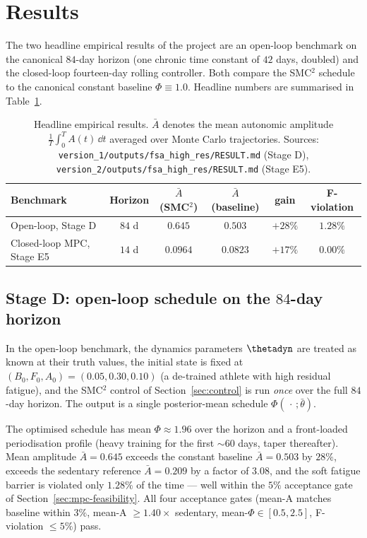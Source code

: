\section{Results}\label{sec:results}

The two headline empirical results of the project are an open-loop
benchmark on the canonical $84$-day horizon (one chronic time constant
of $42$ days, doubled) and the closed-loop fourteen-day rolling
controller. Both compare the SMC${}^2$ schedule to the canonical
constant baseline $\Phi \equiv 1.0$. Headline numbers are summarised in
Table~\ref{tab:results}.

\begin{table}[h]
\centering
\small
\begin{tabular}{@{}lccccc@{}}
\toprule
Benchmark & Horizon & $\bar A$ (SMC${}^2$) & $\bar A$ (baseline) & gain & F-violation \\
\midrule
Open-loop, Stage D     & $84$ d & $0.645$  & $0.503$  & $+28\%$ & $1.28\%$ \\
Closed-loop MPC, Stage E5 & $14$ d & $0.0964$ & $0.0823$ & $+17\%$ & $0.00\%$ \\
\bottomrule
\end{tabular}
\caption{Headline empirical results. $\bar A$ denotes the mean
autonomic amplitude $\frac{1}{T}\int_0^T A(t)\,\dd t$ averaged over Monte
Carlo trajectories. Sources:
\texttt{version\_1/outputs/fsa\_high\_res/RESULT.md} (Stage D),
\texttt{version\_2/outputs/fsa\_high\_res/RESULT.md} (Stage E5).}
\label{tab:results}
\end{table}

\subsection{Stage D: open-loop schedule on the $84$-day horizon}

In the open-loop benchmark, the dynamics parameters $\thetadyn$ are
treated as known at their truth values, the initial state is fixed at
$(B_0,F_0,A_0) = (0.05,0.30,0.10)$ (a de-trained athlete with high
residual fatigue), and the SMC${}^2$ control of Section~\ref{sec:control}
is run \emph{once} over the full $84$-day horizon. The output is a single
posterior-mean schedule $\Phi(\,\cdot\,;\bar\theta)$.

The optimised schedule has mean $\Phi \approx 1.96$ over the horizon and
a front-loaded periodisation profile (heavy training for the first
$\sim 60$ days, taper thereafter). Mean amplitude
$\bar A = 0.645$ exceeds the constant baseline $\bar A = 0.503$ by
$28\%$, exceeds the sedentary reference $\bar A = 0.209$ by a factor of
$3.08$, and the soft fatigue barrier is violated only $1.28\%$ of the
time --- well within the $5\%$ acceptance gate of
Section~\ref{sec:mpc-feasibility}. All four acceptance gates (mean-A
matches baseline within $3\%$, mean-A $\ge 1.40\times$ sedentary, mean-$\Phi
\in [0.5,2.5]$, F-violation $\le 5\%$) pass.

